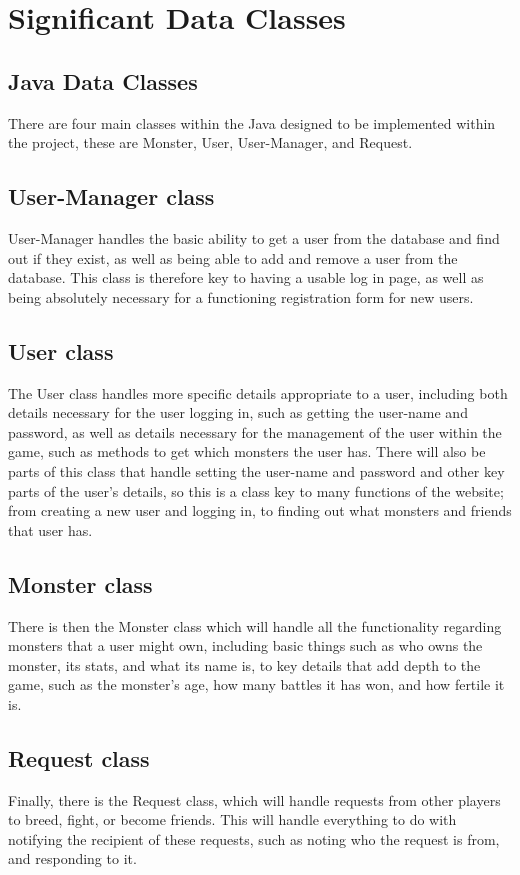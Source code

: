 \documentclass{project}
\begin{document}
\section{Significant Data Classes}
\subsection{Java Data Classes}
There are four main classes within the Java designed to be implemented within the project, these are Monster, User, User-Manager, and Request.
\subsection{User-Manager class}
User-Manager handles the basic ability to get a user from the database and find out if they exist, as well as being able to add and remove a user from the database. This class is therefore key to having a usable log in page, as well as being absolutely necessary for a functioning registration form for new users.
\subsection{User class}
The User class handles more specific details appropriate to a user, including both details necessary for the user logging in, such as getting the user-name and password, as well as details necessary for the management of the user within the game, such as methods to get which monsters the user has. There will also be parts of this class that handle setting the user-name and password and other key parts of the user’s details, so this is a class key to many functions of the website; from creating a new user and logging in, to finding out what monsters and friends that user has.
\subsection{Monster class}
There is then the Monster class which will handle all the functionality regarding monsters that a user might own, including basic things such as who owns the monster, its stats, and what its name is, to key details that add depth to the game, such as the monster’s age, how many battles it has won, and how fertile it is.
\subsection{Request class}
Finally, there is the Request class, which will handle requests from other players to breed, fight, or become friends. This will handle everything to do with notifying the recipient of these requests, such as noting who the request is from, and responding to it.
\end{document}
